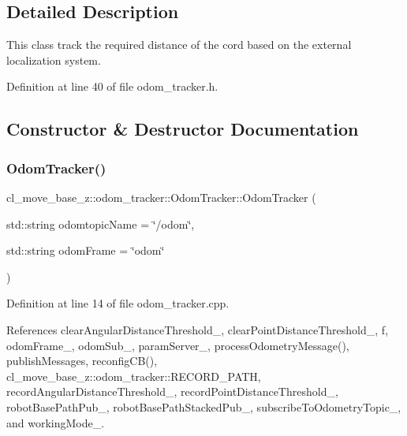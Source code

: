 \subsection{Detailed Description}
This class track the required distance of the cord based on the external localization system. 

Definition at line 40 of file odom\+\_\+tracker.\+h.



\subsection{Constructor \& Destructor Documentation}
\mbox{\label{classcl__move__base__z_1_1odom__tracker_1_1OdomTracker_a99e1f405d0b3ec3e9fc73e666793c409}} 
\subsubsection{\texorpdfstring{Odom\+Tracker()}{OdomTracker()}}
{\footnotesize\ttfamily cl\+\_\+move\+\_\+base\+\_\+z\+::odom\+\_\+tracker\+::\+Odom\+Tracker\+::\+Odom\+Tracker (\begin{DoxyParamCaption}\item[{std\+::string}]{odomtopic\+Name = {\ttfamily \char`\"{}/odom\char`\"{}},  }\item[{std\+::string}]{odom\+Frame = {\ttfamily \char`\"{}odom\char`\"{}} }\end{DoxyParamCaption})}



Definition at line 14 of file odom\+\_\+tracker.\+cpp.



References clear\+Angular\+Distance\+Threshold\+\_\+, clear\+Point\+Distance\+Threshold\+\_\+, f, odom\+Frame\+\_\+, odom\+Sub\+\_\+, param\+Server\+\_\+, process\+Odometry\+Message(), publish\+Messages, reconfig\+C\+B(), cl\+\_\+move\+\_\+base\+\_\+z\+::odom\+\_\+tracker\+::\+R\+E\+C\+O\+R\+D\+\_\+\+P\+A\+TH, record\+Angular\+Distance\+Threshold\+\_\+, record\+Point\+Distance\+Threshold\+\_\+, robot\+Base\+Path\+Pub\+\_\+, robot\+Base\+Path\+Stacked\+Pub\+\_\+, subscribe\+To\+Odometry\+Topic\+\_\+, and working\+Mode\+\_\+.


